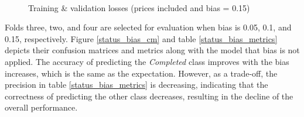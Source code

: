 \documentclass[12pt,twoside]{report}
\begin{document}
\begin{figure}[!htbp]
	\centering
	\hfil
	\hfil
	\\
	\hfil
	\caption{Training \& validation losses (prices included and bias = 0.15)}
	\label{status_015}
\end{figure}

Folds three, two, and four are selected for evaluation when bias is 0.05, 0.1, and 0.15, respectively. Figure \ref{status_bias_cm} and table \ref{status_bias_metrics} depicts their confusion matrices and metrics along with the model that bias is not applied. The accuracy of predicting the \textit{Completed} class improves with the bias increases, which is the same as the expectation. However, as a trade-off, the precision in table \ref{status_bias_metrics} is decreasing, indicating that the correctness of predicting the other class decreases, resulting in the decline of the overall performance.
\\
\end{document}

